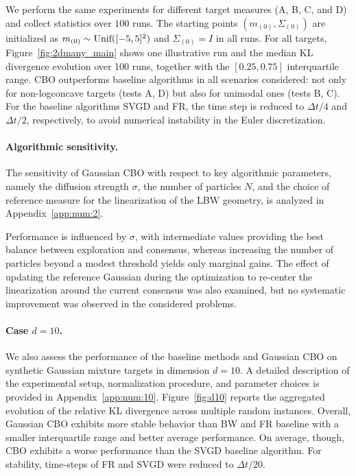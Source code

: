 \documentclass{article}
\theoremstyle{plain}
\theoremstyle{definition}
\theoremstyle{remark}
\newcommand{\rev}{}
\begin{document}
We perform the same experiments for different target measures (A, B, C, and D) and collect statistics over $100$ runs. The starting points $(m_{(0)}, \Sigma_{(0)})$ are initialized as $m_{(0)} \sim \textup{Unif}([-5,5]^2)$ and $\Sigma_{(0)} = I$ in all runs. For all targets, Figure~\ref{fig:2dmany_main} shows one illustrative run and the median KL divergence evolution over 100 runs, together with the $[0.25, 0.75]$ interquartile range. CBO outperforms \rev{baseline algorithms} in all scenarios considered: not only for non-logconcave targets (tests A, D) but also for unimodal ones (tests B, C). \rev{For the baseline algorithms SVGD and FR, the time step is reduced to $\Delta t/4$ and $\Delta t/2$, respectively,} to avoid numerical instability in the \rev{Euler} discretization.



\paragraph{Algorithmic sensitivity.}
The sensitivity of Gaussian CBO with respect to key algorithmic parameters, namely the diffusion strength $\sigma$, the number of particles $N$, and the choice of reference measure for the linearization of the LBW geometry, is analyzed in Appendix~\ref{app:num:2}. 

Performance is influenced by $\sigma$, with intermediate values providing the best balance between exploration and consensus, %
whereas increasing the number of particles beyond a modest threshold yields only marginal gains. %
The effect of updating the reference Gaussian during the optimization to re-center the linearization around the current consensus was also examined, but no systematic improvement was observed in the considered problems. %


\paragraph{Case $d = 10$.}
We also assess the performance of \rev{the baseline methods} and Gaussian CBO on synthetic Gaussian mixture targets in dimension $d=10$. 
A detailed description of the experimental setup, normalization procedure, and parameter choices is provided in Appendix~\ref{app:num:10}. 
Figure~\ref{fig:d10} reports the aggregated evolution of the relative KL divergence across multiple random instances. 
Overall, Gaussian CBO exhibits more stable behavior \rev{than BW and FR baseline} with a smaller interquartile range and better average performance. 
\rev{On average, though, CBO exhibits a worse performance than the SVGD baseline algorithm. For stability, time-steps of FR and SVGD were reduced to $\Delta t/20$.}
\end{document}
